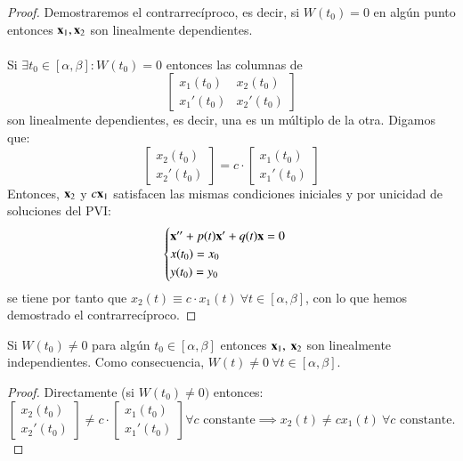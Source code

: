 \begin{proof}
    Demostraremos el contrarrecíproco, es decir, si $W(t_0) = 0$ en algún punto entonces $\mathbf{x}_1, \mathbf{x}_2$ son linealmente dependientes.\\\\
    Si $\exists t_0 \in [\alpha, \beta] : W(t_0) = 0$ entonces las columnas de
    $$
    \left[
    \begin{matrix}
        x_1(t_0) & x_2(t_0)\\
        x_1'(t_0) & x_2'(t_0)
    \end{matrix}
    \right]
    $$
    son linealmente dependientes, es decir, una es un múltiplo de la otra. Digamos que:
    $$
    \left[
    \begin{matrix}
        x_2(t_0)\\
        x_2'(t_0)
    \end{matrix}
    \right] = c \cdot
    \left[
    \begin{matrix}
        x_1(t_0)\\
        x_1'(t_0)
    \end{matrix}
    \right]
    $$
    Entonces, $\mathbf{x}_2$ y $c\mathbf{x}_1$ satisfacen las mismas condiciones iniciales y por unicidad de soluciones del PVI:
    $$
        \begin{cases}
            \mathbf{x}'' + p(t)\mathbf{x}' + q(t)\mathbf{x} = 0\\
            x(t_0) = x_0\\
            y(t_0) = y_0
        \end{cases}
    $$
    se tiene por tanto que $x_2(t) \equiv c \cdot x_1(t)\ \forall t \in [\alpha, \beta]$, con lo que hemos demostrado el contrarrecíproco.
\end{proof}
\begin{pro}
    Si $W(t_0)\neq 0$ para algún $t_0 \in [\alpha, \beta]$ entonces $\mathbf{x}_1,\ \mathbf{x}_2$ son linealmente independientes. Como consecuencia, $W(t) \neq 0\ \forall t\in [\alpha, \beta]$.
\end{pro}
\begin{proof}
    Directamente (si $W(t_0) \neq 0)$ entonces:
    $$
    \left[
    \begin{matrix}
        x_2(t_0)\\
        x_2'(t_0)
    \end{matrix}
    \right] \neq c \cdot
    \left[
    \begin{matrix}
        x_1(t_0)\\
        x_1'(t_0)
    \end{matrix}
    \right] \forall c \text{ constante} \implies x_2(t) \neq c x_1(t)\ \forall c \text{ constante.}
    $$
\end{proof}
